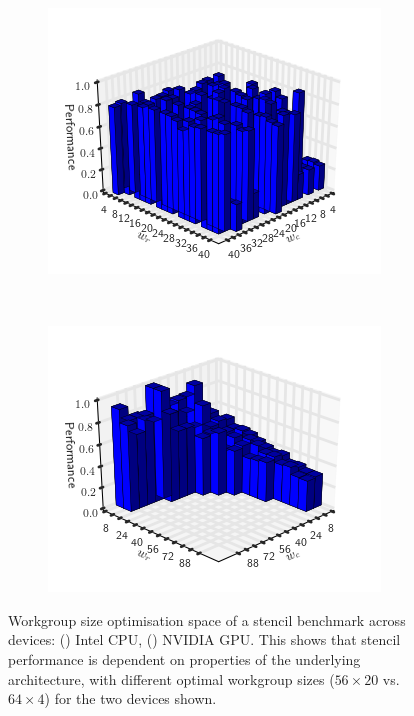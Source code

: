\documentclass[nonatbib,preprint,11pt]{sigplanconf}
\begin{document}
\begin{figure}
\centering
\begin{subfigure}[h]{.45\columnwidth}
\centering
\includegraphics[width=1.0\columnwidth]{img/motivation_1}
\vspace{-1.5em} %
\caption{}
\label{fig:motivation-1}
\end{subfigure}
~%
\begin{subfigure}[h]{.45\columnwidth}
\centering
\includegraphics[width=1.0\columnwidth]{img/motivation_2}
\vspace{-1.5em} %
\caption{}
\label{fig:motivation-2}
\end{subfigure}
\caption[Workgroup size optimisation space across devices]{%
  Workgroup size optimisation space of a stencil benchmark across
  devices: () Intel CPU,
  () NVIDIA GPU. This shows that stencil
  performance is dependent on properties of the underlying
  architecture, with different optimal workgroup sizes ($56 \times 20$
  vs.\ $64 \times 4$) for the two devices shown.%
}
\label{fig:motivation-arch}
\end{figure}
\end{document}
